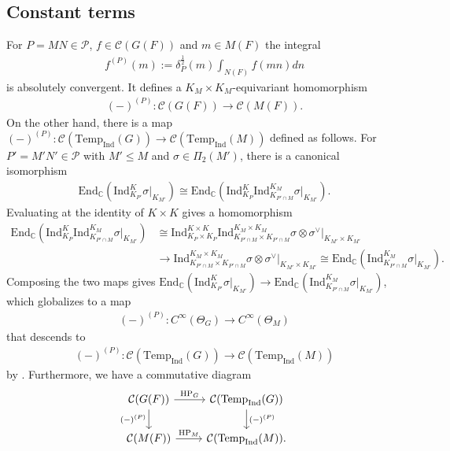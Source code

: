 \documentclass[10pt]{amsart}
\theoremstyle{definition}
\numberwithin{equation}{section}
\numberwithin{equation}{subsection}
\newcommand{\Ind}{\mathrm{Ind}}
\newcommand{\Temp}{\mathrm{Temp}}
\newcommand{\HP}{\mathop{\mathrm{HP}}\nolimits}
\begin{document}
\subsection{Constant terms}\label{ssec:constant} For $P=MN\in \mathcal{P}$, $f\in \mathcal{C}(G(F))$ and $m\in M(F)$ the integral
\begin{align*}
    f^{(P)}(m) := \delta_P^{\frac{1}{2}}(m) \int_{N(F)} f(mn) dn 
\end{align*}
is absolutely convergent. It defines a $K_M\times K_M$-equivariant  homomorphism 
\begin{align*}
    (-)^{(P)}:\mathcal{C}(G(F))\to \mathcal{C}(M(F)).
\end{align*}
On the other hand, there is a map $(-)^{(P)}:\mathcal{C}(\Temp_\Ind(G))\longrightarrow \mathcal{C}(\Temp_\Ind(M))$ defined as follows. For $P'=M'N'\in \mathcal{P}$ with $M'\le M$ and $\sigma\in\Pi_2(M')$, there is a canonical isomorphism
\begin{align*}
    \mathrm{End}_\mathbb{C}(\Ind_{K_{P'}}^K\sigma\vert_{K_{M'}}) \cong \mathrm{End}_{\mathbb{C}}(\Ind_{K_{P}}^K\Ind^{K_{M}}_{K_{P'\cap M}}\sigma\vert_{K_{M'}}).
\end{align*}
Evaluating at the identity of $K\times K$ gives a homomorphism
\begin{align*}
    \mathrm{End}_{\mathbb{C}}(\Ind_{K_{P}}^K\Ind^{K_{M}}_{K_{P'\cap M}}\sigma\vert_{K_{M'}}) &\cong \Ind_{K_{P}\times K_{P}}^{K\times K}\Ind^{K_{M}\times K_{M}}_{K_{P'\cap M}\times K_{P'\cap M}}\sigma\otimes\sigma^\vee\vert_{K_{M'}\times K_{M'}} \\
    &\to \Ind^{K_{M}\times K_{M}}_{K_{P'\cap M}\times K_{P'\cap M}}\sigma\otimes\sigma^\vee\vert_{K_{M'}\times K_{M'}} \cong \mathrm{End}_{\mathbb{C}}(\Ind^{K_{M}}_{K_{P'\cap M}}\sigma\vert_{K_{M'}}).
\end{align*}
Composing the two maps gives $\mathrm{End}_\mathbb{C}(\Ind_{K_{P'}}^K\sigma\vert_{K_{M'}}) \longrightarrow \mathrm{End}_{\mathbb{C}}(\Ind^{K_{M}}_{K_{P'\cap M}}\sigma\vert_{K_{M'}})$, which globalizes to a map
\begin{align*}
    (-)^{(P)}:C^\infty(\Theta_G)\longrightarrow C^\infty(\Theta_M)
\end{align*}
that descends to
\begin{align*}
    (-)^{(P)}:\mathcal{C}(\Temp_\Ind(G))\longrightarrow \mathcal{C}(\Temp_\Ind(M))
\end{align*}
by {\cite[Lemma 2.14]{DRS}}. Furthermore, we have a commutative diagram
\begin{equation}\label{CT:spectral}
    \begin{tikzcd}
        \mathcal{C}(G(F))\arrow[d,swap,"(-)^{(P)}"]\arrow[r,"\HP_G"]&\mathcal{C}(\Temp_\Ind(G))\arrow[d,"(-)^{(P)}"]\\
        \mathcal{C}(M(F))\arrow[r,"\HP_M"]&\mathcal{C}(\Temp_\Ind(M)).
    \end{tikzcd}
\end{equation}
\end{document}
